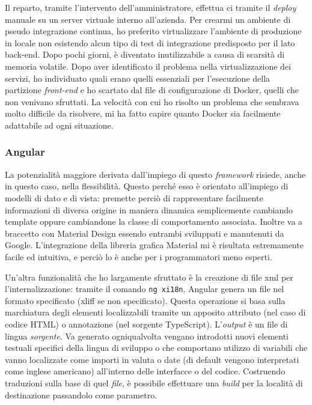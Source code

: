 Il reparto, tramite l'intervento dell'amministratore, effettua \acrshort{ci} tramite il \textit{deploy} manuale su un server virtuale interno all'azienda. Per crearmi un ambiente di pseudo integrazione continua, ho preferito virtualizzare l'ambiente di produzione in locale non esistendo alcun tipo di test di integrazione predisposto per il lato back-end. Dopo pochi giorni, è diventato inutilizzabile a causa di scarsità di memoria volatile. Dopo aver identificato il problema nella virtualizzazione dei servizi, ho individuato quali erano quelli essenziali per l'esecuzione della partizione \textit{front-end} e ho scartato dal file di configurazione di Docker, quelli che non venivano sfruttati.
La velocità con cui ho risolto un problema che sembrava molto difficile da risolvere, mi ha fatto capire quanto Docker sia facilmente adattabile ad ogni situazione.
\subsubsection{Angular}
La potenzialità maggiore derivata dall'impiego di questo \textit{framework} risiede, anche in questo caso, nella flessibilità. Questo perché esso è orientato all'impiego di modelli di dato e di vista: premette perciò di rappresentare facilmente informazioni di diversa origine in maniera dinamica semplicemente cambiando template oppure cambiandone la classe di comportamento associata.
Inoltre va a braccetto con Material Design essendo entrambi sviluppati e manutenuti da Google. L'integrazione della libreria grafica Material mi è risultata estremamente facile ed intuitiva, e perciò lo è anche per i programmatori meno esperti.

Un'altra funzionalità che ho largamente sfruttato è la creazione di file \acrshort{xml} per l'internalizzazione: tramite il comando \verb|ng xi18n|, Angular genera un file nel formato specificato (\acrshort{xliff} se non specificato). Questa operazione si basa sulla marchiatura degli elementi localizzabili tramite un apposito attributo (nel caso di codice HTML) o annotazione (nel sorgente TypeScript). L'\textit{output} è un file di lingua \emph{sorgente}. Va generato ogniqualvolta vengano introdotti nuovi elementi testuali specifici della lingua di sviluppo o che comportano utilizzo di variabili che vanno localizzate come importi in valuta o date (di default vengono interpretati come inglese americano) all'interno delle interfacce o del codice. Costruendo traduzioni sulla base di quel \textit{file}, è possibile effettuare una \textit{build} per la località di destinazione passandolo come parametro.
\newpage
